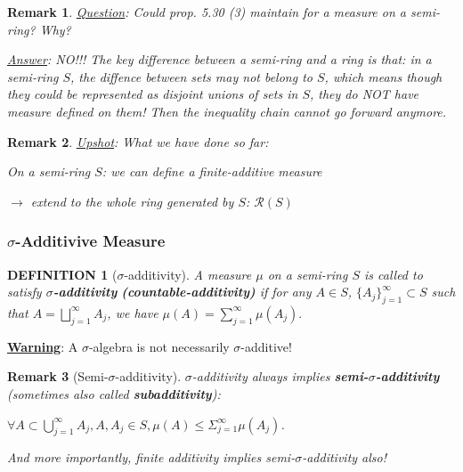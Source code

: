 \documentclass[12pt]{article}
\theoremstyle{blueplain}
\theoremstyle{bluedef}
\newtheorem{definition}{DEFINITION}[section]
\theoremstyle{blueremark}
\newtheorem{remark}{Remark}[section]
\numberwithin{equation}{section}
\begin{document}
\begin{remark}
  \underline{Question}: Could prop. 5.30 (3) maintain for a measure on a semi-ring? Why?

  \underline{Answer}: NO!!! The key difference between a semi-ring and a ring is that: in a semi-ring $S$, the diffence between sets may not belong to $S$, which means though they could be represented as disjoint unions of sets in $S$, they do NOT have measure defined on them! Then the inequality chain cannot go forward anymore.
\end{remark}

\begin{remark}
  \underline{Upshot}: What we have done so far:

  On a semi-ring $S$: we can define a finite-additive measure

  $\rightarrow$ extend to the whole ring generated by $S$: $\mathcal{R}(S)$
\end{remark}

\subsubsection{$\sigma$-Additivive Measure}

\begin{definition}[$\sigma$-additivity]

  A measure $\mu$ on a semi-ring $S$ is called to satisfy \textbf{$\sigma$-additivity} \textbf{(countable-additivity)} if for any $A \in S$, $\{A_j\}_{j=1}^{\infty} \subset S$ such that $A = \bigsqcup_{j=1}^\infty A_j$, we have
  \(\mu(A) = \sum_{j=1}^\infty \mu(A_j).\)
\end{definition}

\textbf{\underline{Warning}}: A $\sigma$-algebra is not necessarily $\sigma$-additive!

\begin{remark}[Semi-$\sigma$-additivity]

  $\sigma$-additivity always implies \textbf{semi-$\sigma$-additivity} (sometimes also called \textbf{subadditivity}):

  $\forall A \subset \bigcup_{j=1}^{\infty} A_j, A,A_j \in S, \mu(A) \leq \Sigma_{j=1}^{\infty}\mu(A_j)$.

  And more importantly, finite additivity implies semi-$\sigma$-additivity also!
\end{remark}
\end{document}
